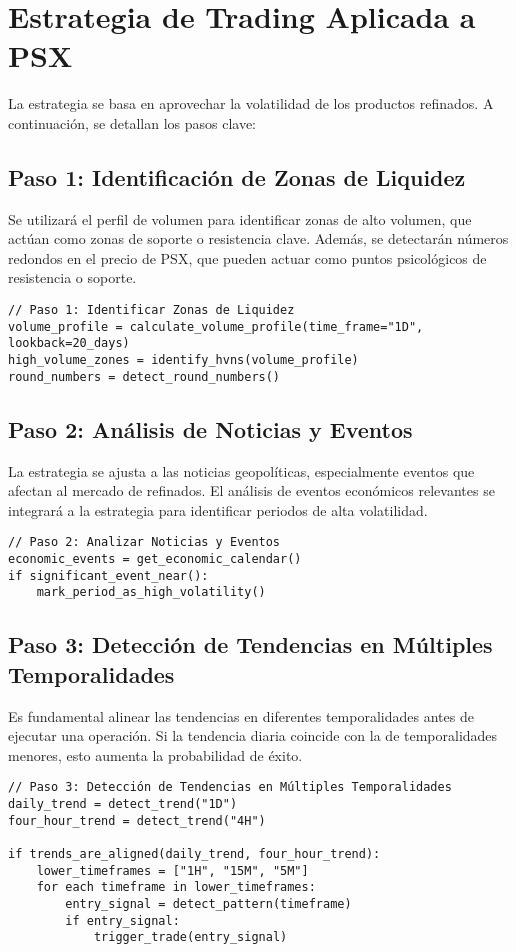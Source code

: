 \documentclass[12pt]{article}
\begin{document}
\section{Estrategia de Trading Aplicada a PSX}
La estrategia se basa en aprovechar la volatilidad de los productos refinados. A continuación, se detallan los pasos clave:

\subsection{Paso 1: Identificación de Zonas de Liquidez}
Se utilizará el perfil de volumen para identificar zonas de alto volumen, que actúan como zonas de soporte o resistencia clave. Además, se detectarán números redondos en el precio de PSX, que pueden actuar como puntos psicológicos de resistencia o soporte.

\begin{verbatim}
// Paso 1: Identificar Zonas de Liquidez
volume_profile = calculate_volume_profile(time_frame="1D", lookback=20_days)
high_volume_zones = identify_hvns(volume_profile)
round_numbers = detect_round_numbers()
\end{verbatim}

\subsection{Paso 2: Análisis de Noticias y Eventos}
La estrategia se ajusta a las noticias geopolíticas, especialmente eventos que afectan al mercado de refinados. El análisis de eventos económicos relevantes se integrará a la estrategia para identificar periodos de alta volatilidad.

\begin{verbatim}
// Paso 2: Analizar Noticias y Eventos
economic_events = get_economic_calendar()
if significant_event_near():
    mark_period_as_high_volatility()
\end{verbatim}

\subsection{Paso 3: Detección de Tendencias en Múltiples Temporalidades}
Es fundamental alinear las tendencias en diferentes temporalidades antes de ejecutar una operación. Si la tendencia diaria coincide con la de temporalidades menores, esto aumenta la probabilidad de éxito.

\begin{verbatim}
// Paso 3: Detección de Tendencias en Múltiples Temporalidades
daily_trend = detect_trend("1D")
four_hour_trend = detect_trend("4H")

if trends_are_aligned(daily_trend, four_hour_trend):
    lower_timeframes = ["1H", "15M", "5M"]
    for each timeframe in lower_timeframes:
        entry_signal = detect_pattern(timeframe)
        if entry_signal:
            trigger_trade(entry_signal)
\end{verbatim}
\end{document}
